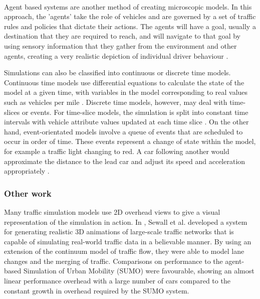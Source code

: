 \paragraph{}
Agent based systems are another method of creating microscopic models. In this approach, the 'agents' take the role of vehicles and are governed by a set of traffic rules and policies that dictate their actions. The agents will have a goal, usually a destination that they are required to reach, and will navigate to that goal by using sensory information that they gather from the environment and other agents, creating a very realistic depiction of individual driver behaviour \cite{948773,4621183}.

Simulations can also be classified into continuous or discrete time models.
Continuous time models use differential equations to calculate the state of the model at a given time, with variables in the model corresponding to real values such as vehicles per mile \cite{Lighthill1955Kinetic}.
Discrete time models, however, may deal with time-slices or events. For time-slice models, the simulation is split into constant time intervals with vehicle attribute values updated at each time slice \cite{Schulze:1997:UTS:268437.268764}. On the other hand, event-orientated models involve a queue of events that are scheduled to occur in order of time. These events represent a change of state within the model, for example a traffic light changing to red. A car following another would approximate the distance to the lead car and adjust its speed and acceleration appropriately \cite{Schulze:1997:UTS:268437.268764,algers1997review}.

\subsubsection*{Other work}
Many traffic simulation models use 2D overhead views to give a visual representation of the simulation in action. In \cite{sewall2010continuum}, Sewall et al. developed a system for generating realistic 3D animations of large-scale traffic networks that is capable of simulating real-world traffic data in a believable manner. By using an extension of the continuum model of traffic flow, they were able to model lane changes and the merging of traffic. Comparisons on performance to the agent-based Simulation of Urban Mobility (SUMO) \cite{SUMO} were favourable, showing an almost linear performance overhead with a large number of cars compared to the constant growth in overhead required by the SUMO system.

